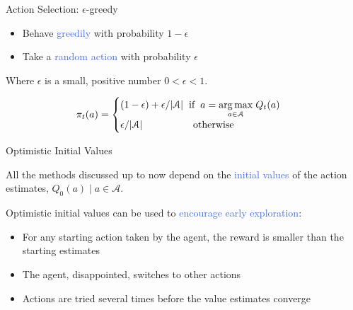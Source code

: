 \documentclass{beamer}
\DeclareMathOperator*{\argmax}{arg\,max}
\begin{document}
\begin{frame}{Action Selection: $\epsilon$-greedy}



\begin{itemize}
    \item Behave \textcolor{RoyalBlue}{greedily} with probability $1-\epsilon$
    \item Take a \textcolor{RoyalBlue}{random action} with probability $\epsilon$
\end{itemize}

\vspace{2mm}

Where $\epsilon$ is a small, positive number $0 < \epsilon < 1$.

\begin{align*}
 \pi_t(a) =
    \begin{cases}
      (1-\epsilon) + \epsilon/|\mathcal{A}| \hspace{2mm} \text{if} \hspace{2mm} a=\underset{a \in \mathcal{A}}{\argmax} \; Q_t(a)\\
       \epsilon/|\mathcal{A}|  \hspace{18mm} \text{otherwise}
    \end{cases}       
\end{align*}


\end{frame}




\begin{frame}{Optimistic Initial Values}

All the methods discussed up to now depend on the \textcolor{RoyalBlue}{initial values} of the action estimates,  $Q_0(a) \; | \; a \in \mathcal{A}$.

\vspace{5mm}

Optimistic initial values can be used to \textcolor{RoyalBlue}{encourage early exploration}:

\vspace{1mm}
\begin{itemize}
    \item For any starting action taken by the agent, the reward is smaller than the starting estimates
    \item The agent, disappointed, switches to other actions
    \item Actions are tried several times before the value estimates converge
\end{itemize}
\end{frame}
\end{document}
